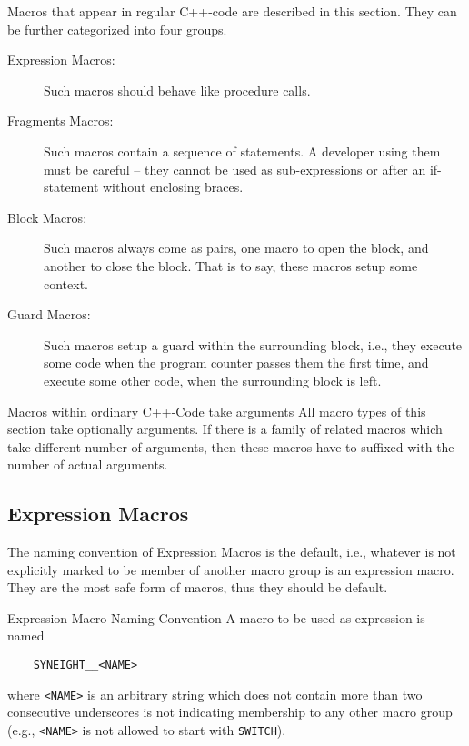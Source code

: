 Macros that appear in regular C++-code are described in this
section. They can be further categorized into four groups.
\begin{description}
\item[Expression Macros:] Such macros should behave like procedure
  calls. 
\item[Fragments Macros:] Such macros contain a sequence of statements.
  A developer using them must be careful -- they cannot be used as
  sub-expressions or after an if-statement without enclosing braces.
\item[Block Macros:] Such macros always come as pairs, one macro to
  open the block, and another to close the block. That is to say,
  these macros setup some context.
\item[Guard Macros:] Such macros setup a guard within the surrounding
  block, i.e., they execute some code when the program counter passes
  them the first time, and execute some other code, when the
  surrounding block is left.
\end{description}


\begin{rule*}{Macros within ordinary C++-Code take arguments}
  All macro types of this section take optionally arguments. If there
  is a family of related macros which take different number of
  arguments, then these macros have to suffixed with the number of
  actual arguments.
\end{rule*}

\subsection{Expression Macros}
\label{sec:expression-macros}

The naming convention of Expression Macros is the default, i.e.,
whatever is not explicitly marked to be member of another macro group
is an expression macro. They are the most safe form of macros, thus
they should be default. 

\begin{rule*}{Expression Macro Naming Convention}
  A macro to be used as expression is named
  \begin{verbatim}
    SYNEIGHT__<NAME>
  \end{verbatim}
  where {\tt <NAME>} is an arbitrary string which does not contain
  more than two consecutive underscores is not indicating membership
  to any other macro group (e.g., {\tt <NAME>} is not allowed to start
  with {\tt SWITCH}).
\end{rule*}

